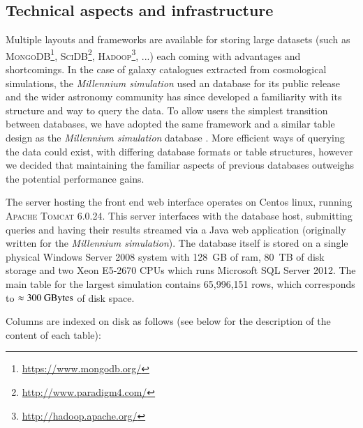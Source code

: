 
\subsection{Technical aspects and infrastructure}
\label{subsection:technical_aspects}

Multiple layouts and frameworks are available for storing large datasets (such
as \textsc{MongoDB}\footnote{\url{https://www.mongodb.org/}},
\textsc{SciDB}\footnote{\url{http://www.paradigm4.com/}},
\textsc{Hadoop}\footnote{\url{http://hadoop.apache.org/}}, ...) each coming with
advantages and shortcomings. In the case of galaxy catalogues extracted from
cosmological simulations, the \textit{Millennium simulation} used an \sql
database for its public release and the wider astronomy community has since
developed a familiarity with its structure and way to query the data. To allow
users the simplest transition between databases, we have adopted the same
framework and a similar table design as the \textit{Millennium simulation} \sql
database \citep{Lemson2006b}. More efficient ways of querying the data could
exist, with differing database formats or table structures, however we decided
that maintaining the familiar aspects of previous databases outweighs the
potential performance gains.

The server hosting the front end web interface operates on Centos linux, running
\textsc{Apache Tomcat 6.0.24}. This server interfaces with the database host,
submitting queries and having their results streamed via a Java web application
(originally written for the \textit{Millennium simulation}). The database itself
is stored on a single physical Windows Server 2008 system with 128~GB of ram,
80~TB of disk storage and two Xeon E5-2670 CPUs which runs Microsoft SQL Server
2012. The main table for the largest simulation contains 65,996,151 rows, which
corresponds to $\approx300~\rm{GBytes}$ of disk space.

Columns are indexed on disk as follows (see below for the description of the
content of each table):

